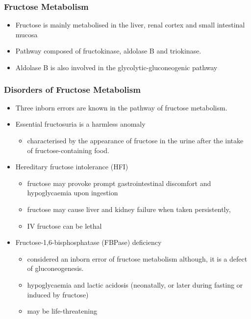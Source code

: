 \documentclass{scrartcl}
\begin{document}
\subsubsection{Fructose Metabolism}
\label{sec:orged09103}
\begin{itemize}
\item Fructose is mainly metabolised in the liver, renal cortex and small intestinal mucosa
\item Pathway composed of fructokinase, aldolase B and triokinase.
\item Aldolase B is also involved in the glycolytic-gluconeogenic pathway
\end{itemize}

\subsubsection{Disorders of Fructose Metabolism}
\label{sec:org3aa2b32}
\begin{itemize}
\item Three inborn errors are known in the pathway of fructose metabolism.
\item Essential fructosuria is a harmless anomaly
\begin{itemize}
\item characterised by the appearance of fructose in the urine after the intake of fructose-containing food.
\end{itemize}
\item Hereditary fructose intolerance (HFI)
\begin{itemize}
\item fructose may provoke prompt gastrointestinal discomfort and hypoglycaemia upon ingestion
\item fructose may cause liver and kidney failure when taken persistently,
\item IV fructose can be lethal
\end{itemize}
\item Fructose-1,6-bisphosphatase (FBPase) deficiency
\begin{itemize}
\item considered an inborn error of fructose metabolism although, it is a defect of gluconeogenesis.
\item hypoglycaemia and lactic acidosis (neonatally, or later during fasting or induced by fructose)
\item may be life-threatening
\end{itemize}
\end{itemize}
\end{document}

